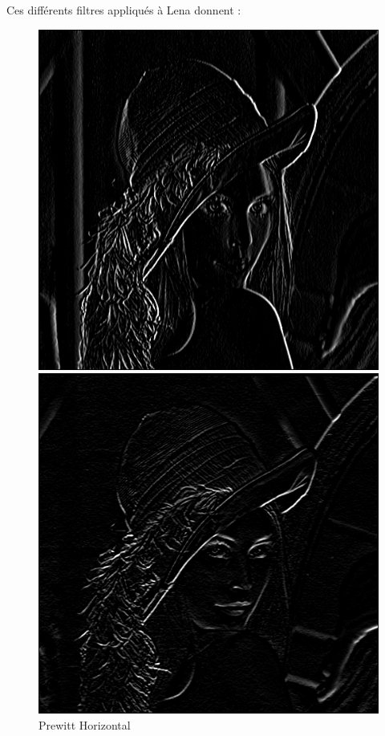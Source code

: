 \documentclass[11pt]{article}
\begin{document}
	\vskip 0.5cm 
	Ces différents filtres appliqués à Lena donnent : 

	\begin{figure}[H]
		\begin{minipage}[c]{.46\linewidth}
			\centering
			\includegraphics[scale=0.25]{Image/filtrePrewittHorizontal.png}
			\caption{Prewitt Horizontal}
			\label{fig:PrewittHorizontal}
		\end{minipage} \hfill
		\begin{minipage}[c]{.46\linewidth}
		\centering
			\includegraphics[scale=0.25]{Image/filtrePrewittVertical.png}

\end{minipage}
\end{figure}
\end{document}
